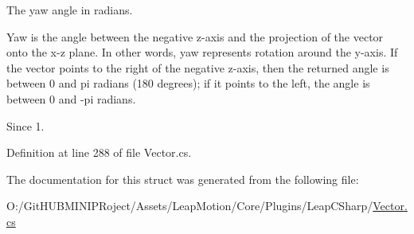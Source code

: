 The yaw angle in radians. 

Yaw is the angle between the negative z-\/axis and the projection of the vector onto the x-\/z plane. In other words, yaw represents rotation around the y-\/axis. If the vector points to the right of the negative z-\/axis, then the returned angle is between 0 and pi radians (180 degrees); if it points to the left, the angle is between 0 and -\/pi radians.

\begin{DoxySince}{Since}
1. 
\end{DoxySince}


Definition at line 288 of file Vector.\+cs.



The documentation for this struct was generated from the following file\+:\begin{DoxyCompactItemize}
\item 
O\+:/\+Git\+H\+U\+B\+M\+I\+N\+I\+P\+Roject/\+Assets/\+Leap\+Motion/\+Core/\+Plugins/\+Leap\+C\+Sharp/\mbox{\hyperlink{_vector_8cs}{Vector.\+cs}}\end{DoxyCompactItemize}
